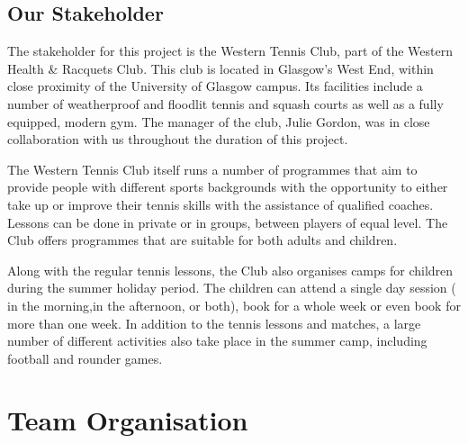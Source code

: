 \documentclass{l3proj}
\begin{document}
\section{Our Stakeholder}
\par
The stakeholder for this project is the Western Tennis Club, part of the Western Health \& Racquets Club. This club is located in Glasgow’s West End, within close proximity of the University of Glasgow campus. Its facilities include a number of weatherproof and floodlit tennis and squash courts as well as a fully equipped, modern gym. The manager of the club, Julie Gordon, was in close collaboration with us throughout the duration of this project.
\par
The Western Tennis Club itself runs a number of programmes that aim to provide people with different sports backgrounds with the opportunity to either take up or improve their tennis skills with the assistance of qualified coaches. Lessons can be done in private or in groups, between players of equal level. The Club offers programmes that are suitable for both adults and children.
\par
Along with the regular tennis lessons, the Club also organises camps for children during the summer holiday period. The children can attend a single day session ( in the morning,in the afternoon, or both), book for a whole week or even book for more than one week. In addition to the tennis lessons and matches, a large number of different activities also take place in the summer camp, including football and rounder games.

\chapter{Team Organisation}
\label{teamorganisation}

\end{document}
